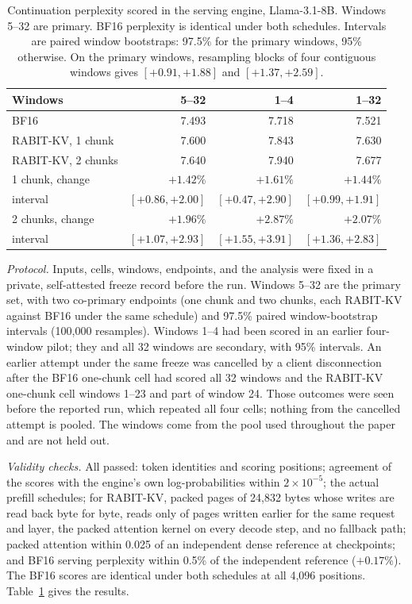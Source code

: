 \documentclass{article}
\begin{document}
\begin{table}[t]
\centering
\small
\setlength{\tabcolsep}{5pt}
\begin{tabular}{@{}lrrr@{}}
\toprule
Windows & 5--32 & 1--4 & 1--32 \\
\midrule
BF16 & 7.493 & 7.718 & 7.521 \\
RABIT-KV, 1 chunk & 7.600 & 7.843 & 7.630 \\
RABIT-KV, 2 chunks & 7.640 & 7.940 & 7.677 \\
1 chunk, change & $+1.42\%$ & $+1.61\%$ & $+1.44\%$ \\
\quad interval & $[+0.86, +2.00]$ & $[+0.47, +2.90]$ & $[+0.99, +1.91]$ \\
2 chunks, change & $+1.96\%$ & $+2.87\%$ & $+2.07\%$ \\
\quad interval & $[+1.07, +2.93]$ & $[+1.55, +3.91]$ & $[+1.36, +2.83]$ \\
\bottomrule
\end{tabular}
\caption{Continuation perplexity scored in the serving engine, Llama-3.1-8B. Windows 5--32 are
primary. BF16 perplexity is identical under both schedules. Intervals are paired window bootstraps: 97.5\% for the primary windows,
95\% otherwise. On the primary windows, resampling blocks of four contiguous windows gives
$[+0.91, +1.88]$ and $[+1.37, +2.59]$.}
\label{tab:app-serving-ppl}
\end{table}

\emph{Protocol.} Inputs, cells, windows, endpoints, and the analysis were fixed in a private,
self-attested freeze record before the run. Windows 5--32 are the primary set, with two co-primary
endpoints (one chunk and two chunks, each RABIT-KV against BF16 under the same schedule) and 97.5\%
paired window-bootstrap intervals (100,000 resamples). Windows 1--4 had been scored in an earlier
four-window pilot; they and all 32 windows are secondary, with 95\% intervals. An earlier attempt under
the same freeze was cancelled by a client disconnection after the BF16 one-chunk cell had scored all 32
windows and the RABIT-KV one-chunk cell windows 1--23 and part of window 24. Those outcomes were seen
before the reported run, which repeated all four cells; nothing from the cancelled attempt is pooled.
The windows come from the pool used throughout the paper and are not held out.

\emph{Validity checks.} All passed: token identities and scoring positions; agreement of the scores
with the engine's own log-probabilities within $2\times10^{-5}$; the actual prefill schedules; for
RABIT-KV, packed pages of 24,832 bytes whose writes are read back byte for byte, reads only of pages
written earlier for the same request and layer, the packed attention kernel on every decode step, and
no fallback path; packed attention within 0.025 of an independent dense reference at checkpoints; and
BF16 serving perplexity within 0.5\% of the independent reference ($+0.17\%$). The BF16 scores are
identical under both schedules at all 4,096 positions. Table~\ref{tab:app-serving-ppl} gives the results.
\end{document}
